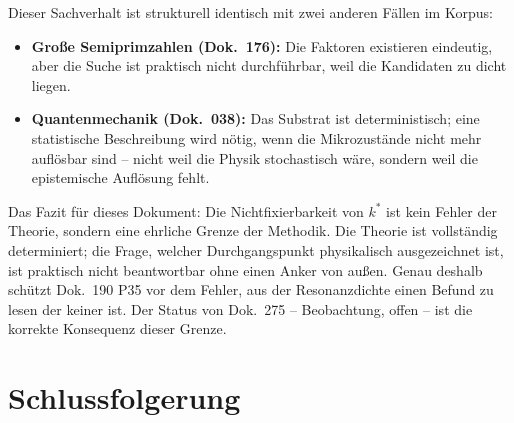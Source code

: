 Dieser Sachverhalt ist strukturell identisch mit zwei anderen Fällen
im Korpus:
\begin{itemize}
  \item \textbf{Große Semiprimzahlen (Dok.~176):} Die Faktoren
        existieren eindeutig, aber die Suche ist praktisch nicht
        durchführbar, weil die Kandidaten zu dicht liegen.
  \item \textbf{Quantenmechanik (Dok.~038):} Das Substrat ist
        deterministisch; eine statistische Beschreibung wird nötig,
        wenn die Mikrozustände nicht mehr auflösbar sind -- nicht weil
        die Physik stochastisch wäre, sondern weil die epistemische
        Auflösung fehlt.
\end{itemize}

Das Fazit für dieses Dokument: Die Nichtfixierbarkeit von $k^*$ ist
kein Fehler der Theorie, sondern eine ehrliche Grenze der Methodik.
Die Theorie ist vollständig determiniert; die Frage, welcher
Durchgangspunkt physikalisch ausgezeichnet ist, ist praktisch nicht
beantwortbar ohne einen Anker von außen. Genau deshalb schützt
Dok.~190 P35 vor dem Fehler, aus der Resonanzdichte einen Befund
zu lesen der keiner ist. Der Status von Dok.~275 -- Beobachtung,
offen -- ist die korrekte Konsequenz dieser Grenze.

\section{Schlussfolgerung}

